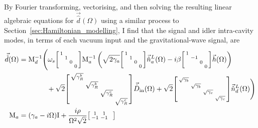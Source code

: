 By Fourier transforming, vectorising, and then solving the resulting linear algebraic equations for $\vec{\hat d}(\Omega)$ using a similar process to Section~\ref{sec:Hamiltonian_modelling}, I find that the signal and idler intra-cavity modes, in terms of each vacuum input and the gravitational-wave signal, are
\begingroup
\allowdisplaybreaks
\begin{align}\label{eq:nIS_vecb}
\vec{\hat{d}}(\Omega)&= \mathrm{M}_d^{-1}\Biggl(\omega_s\begin{bsmallmatrix}
1 &  &  &  \\
 & 1 &  &  \\
 &  & 0 &  \\
 &  &  & 0
\end{bsmallmatrix}\mathrm{M}_a^{-1}\left(\sqrt{2\gamma_a}\begin{bsmallmatrix}
1 &  &  &  \\
 & 1 &  &  \\
 &  & 0 &  \\
 &  &  & 0
\end{bsmallmatrix}\vec{\hat{n}}^L_a(\Omega)-i\beta\begin{bsmallmatrix}
1 &  &  &  \\
 & -1 &  &  \\
 &  & 0 &  \\
 &  &  & 0
\end{bsmallmatrix}\vec{h}(\Omega)\right)\\&\hspace{1.4cm}+ \sqrt{2}\begin{bsmallmatrix}
\sqrt{\gamma^b_R} &  &  &  \\
 & \sqrt{\gamma^b_R} &  &  \\
 &  & \sqrt{\gamma^c_R} &  \\
 &  &  & \sqrt{\gamma^c_R}
\end{bsmallmatrix}\vec{\hat D}_\mathrm{in}(\Omega) + \sqrt{2}\begin{bsmallmatrix}
\sqrt{\gamma_b} &  &  &  \\
 & \sqrt{\gamma_b} &  &  \\
 &  & \sqrt{\gamma_c} &  \\
 &  &  & \sqrt{\gamma_c}
\end{bsmallmatrix}\vec{\hat n}^L_d(\Omega)\Biggr)\nonumber\\
\mathrm{M}_a &= (\gamma_a-i\Omega)\mathrm{I}+\frac{i\rho}{\Omega^2 \sqrt{2}}\begin{bsmallmatrix}
1 & 1 &  &  \\
-1 & -1 &  &  \\

\end{bsmallmatrix}
\end{align}
